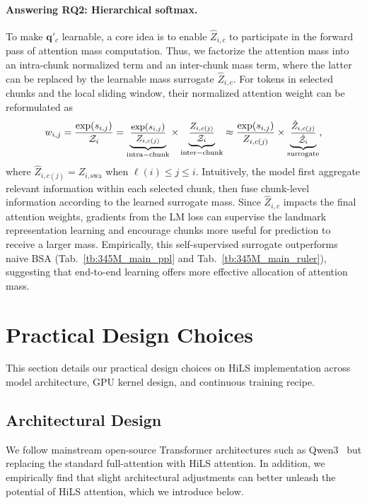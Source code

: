 \paragraph{Answering RQ2: Hierarchical softmax.} 
To make $\mathbf{q}'_c$ learnable, a core idea is to enable $\hat{Z}_{i,c}$ to participate in the forward pass of attention mass computation. Thus, we factorize the attention mass into an intra-chunk normalized term and an inter-chunk mass term, where the latter can be replaced by the learnable mass surrogate $\hat{Z}_{i,c}$. For tokens in selected chunks and the local sliding window, their normalized attention weight can be reformulated as
\begin{equation}
\label{eq:hils-attn-weights}
\small
w_{i,j}=\frac{\exp(s_{i,j})}{\mathcal{Z}_i}=\underbrace{\frac{\exp(s_{i,j})}{Z_{i,c(j)}}}_{\mathrm{intra-chunk}}\times \underbrace{\frac{Z_{i,c(j)}}{\mathcal{Z}_i}}_{\mathrm{inter-chunk}}\approx \frac{\exp(s_{i,j})}{Z_{i,c(j)}}\times \underbrace{\frac{\hat{Z}_{i,c(j)}}{\hat{\mathcal{Z}}_i}}_{\mathrm{surrogate}},
\end{equation}
where $\hat{Z}_{i,c(j)}=Z_{i,\mathrm{swa}}$ when $\ell(i)\le j \le i$. Intuitively, the model first aggregate relevant information within each selected chunk, then fuse chunk-level information according to the learned surrogate mass. Since $\hat{Z}_{i,c}$ impacts the final
attention weights, gradients from the LM loss can supervise the landmark representation learning and encourage chunks more useful for prediction to receive a larger mass. Empirically, this self-supervised surrogate outperforms naive BSA (Tab.~\ref{tb:345M_main_ppl} and Tab.~\ref{tb:345M_main_ruler}), suggesting that end-to-end learning
offers more effective allocation of attention mass.


\section{Practical Design Choices}

This section details our practical design choices on HiLS implementation across model architecture, GPU kernel design, and continuous training recipe.

\subsection{Architectural Design}

We follow mainstream open-source Transformer architectures such as Qwen3~\cite{yang2025qwen3} but replacing the standard full-attention with HiLS attention. In addition, we empirically find that slight architectural adjustments can better unleash the potential of HiLS attention, which we introduce below.
